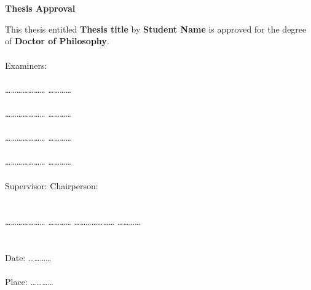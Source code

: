 \chapter*{}
\thispagestyle{empty}
\vspace{-1in}
\begin{center}
{\Large  {\bf Thesis Approval}}
\end{center}
\vspace*{0.1in} \noindent This thesis entitled {\large \bf Thesis title} by {\bf \large
Student Name} is approved for the degree of  {\large \bf Doctor of Philosophy}.\\\\
\hspace*{4 in} Examiners:\\\\
\hspace*{3.5 in} \ldots\ldots \ldots \ldots \ldots \ldots\ldots
\ldots \ldots \ldots\ldots\\\\
\hspace*{3.5 in} \ldots\ldots \ldots \ldots \ldots \ldots\ldots
\ldots \ldots \ldots\ldots\\\\
\hspace*{3.5 in} \ldots\ldots \ldots \ldots \ldots \ldots\ldots
\ldots \ldots \ldots\ldots\\\\
  \hspace*{3.5in} \ldots\ldots \ldots \ldots \ldots \ldots\ldots
\ldots \ldots \ldots\ldots\\\\
 Supervisor:\hspace*{3.5 in}  Chairperson:\\\\\\
\ldots\ldots \ldots \ldots \ldots \ldots\ldots
\ldots \ldots \ldots\ldots
\hspace*{1.0 in} \ldots\ldots \ldots \ldots \ldots \ldots\ldots
\ldots \ldots \ldots\ldots\\\\\\

\noindent
Date: \ldots\ldots \ldots \ldots\\\\
Place: \ldots\ldots \ldots \ldots
